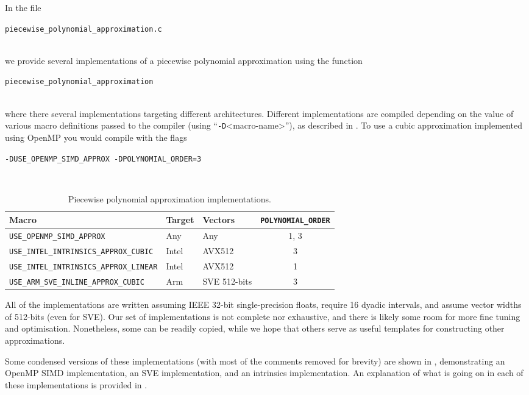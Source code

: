 \documentclass[11pt,a4paper,twoside,english]{extarticle}
\newcommand{\singlecodeline}[1]{\\[1em]\centerline{\lstinline[basicstyle=\ttfamily]$#1$}\\[1em]}
\begin{document}
In the file \singlecodeline{piecewise_polynomial_approximation.c} we provide several implementations of a piecewise polynomial approximation using the function \singlecodeline{piecewise_polynomial_approximation}
where there several implementations targeting different architectures. Different implementations are compiled depending on the value of various macro definitions passed to the compiler (using ``\verb|-D|<macro-name>''), as described in . To use a cubic approximation implemented using OpenMP you would compile with the flags
\singlecodeline{-DUSE_OPENMP_SIMD_APPROX -DPOLYNOMIAL_ORDER=3}

\begin{table}[htb]
\centering
\begin{tabular}{lllc}
Macro & Target & Vectors &  \verb|POLYNOMIAL_ORDER| \\
\hline
\verb|USE_OPENMP_SIMD_APPROX|  & Any & Any & 1, 3\\
\verb|USE_INTEL_INTRINSICS_APPROX_CUBIC| & Intel & AVX512& 3\\
\verb|USE_INTEL_INTRINSICS_APPROX_LINEAR| &Intel &  AVX512 & 1\\
\verb|USE_ARM_SVE_INLINE_APPROX_CUBIC| & Arm & SVE 512-bits & 3 \\
\end{tabular}
\caption{Piecewise polynomial approximation implementations.}
\label{tab:piecewise_polynomial_approximation_implementations}
\end{table} 

All of the implementations are written assuming IEEE 32-bit single-precision floats, require 16 dyadic intervals, and assume vector widths of 512-bits (even for SVE). Our set of implementations is not complete nor exhaustive, and there is likely some room for more fine tuning and optimisation. Nonetheless, some can be readily copied, while we hope that others serve as useful templates for constructing other approximations. 

Some condensed versions of these implementations (with most of the comments removed for brevity) are shown in , demonstrating an OpenMP SIMD implementation, an \arm SVE implementation, and an \intel intrinsics implementation. An explanation of what is going on in each of these implementations is provided in .
\end{document}
